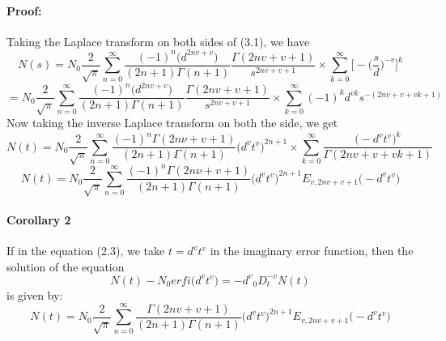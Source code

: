 \documentclass[leqno]{article}
\begin{document}
\paragraph{Proof:}
Taking the Laplace transform on both sides of (3.1), we have\\ 
\begin{equation*}
    N(s)=N_0
    {\frac{2}{\sqrt{\pi}}}
    \sum_{n = 0}^{\infty}
    \frac{(-1)^n{\big(d^{2nv+v}\big)}}{(2n+1)\Gamma{(n+1)}}
    \frac{\Gamma{(2nv+v+1)}}{s^{2nv+v+1}}
    \times
    \sum_{k=0}^{\infty}
    \bigg[
        -{\bigg(\frac{s}{d}\bigg)^{-v}}
    \bigg]^k
\end{equation*}
\begin{equation*}
    =N_0
    {\frac{2}{\sqrt{\pi}}}
    \sum_{n = 0}^{\infty}
    \frac{(-1)^n{\big(d^{2nv+v}\big)}}{(2n+1)\Gamma{(n+1)}}
    \frac{\Gamma{(2nv+v+1)}}{s^{2nv+v+1}}
    \times
    \sum_{k=0}^{\infty}
    (-1)^k{d^{vk}}{s^{-(2nv+v+vk+1)}}
\end{equation*}
Now taking the inverse Laplace transform on both the side, we get
\begin{equation*}
    N(t) = N_0
    \frac{2}{\sqrt{\pi}}
    \sum_{n = 0}^{\infty}
    \frac{{(-1)^n}{\Gamma{(2n \nu +v+1)}}}{(2n+1)\Gamma{(n+1)}}
    \big({d^v}{t^v}\big)^{2n+1}
    \times
    \sum_{k=0}^{\infty}
    \frac{\big(-{d^v}{t^v}\big)^k}{\Gamma(2nv+v+vk+1)}
\end{equation*}
\begin{equation*}
    N(t) = N_0
    \frac{2}{\sqrt{\pi}}
    \sum_{n = 0}^{\infty}
    \frac{{(-1)^n}{\Gamma{(2n \nu +v+1)}}}{(2n+1)\Gamma{(n+1)}}
    \big({d^v}{t^v}\big)^{2n+1}
    E_{v,2nv+v+1}
    \big(-{d^v}{t^v}\big)
\end{equation*}
\paragraph{Corollary 2}
If in the equation (2.3), we take $t = {d^v}{t^v}$ in the imaginary error function, then the solution of the equation
\begin{equation}
    N(t) -{N_0}erfi\big({d^v}{t^v}\big)= {-d^v}{_0D_t^{-v}}N(t)
\end{equation}
is given by: 
\begin{equation}
    N(t) = N_0
    \frac{2}{\sqrt{\pi}}
    \sum_{n = 0}^{\infty}
    \frac{\Gamma{(2nv+v+1)}}{(2n+1)\Gamma{(n+1)}}
    \big({d^v}{t^v}\big)^{2n+1}
    E_{v,2nv+v+1}
    \big(-{d^v}{t^v}\big)
\end{equation}
\end{document}

